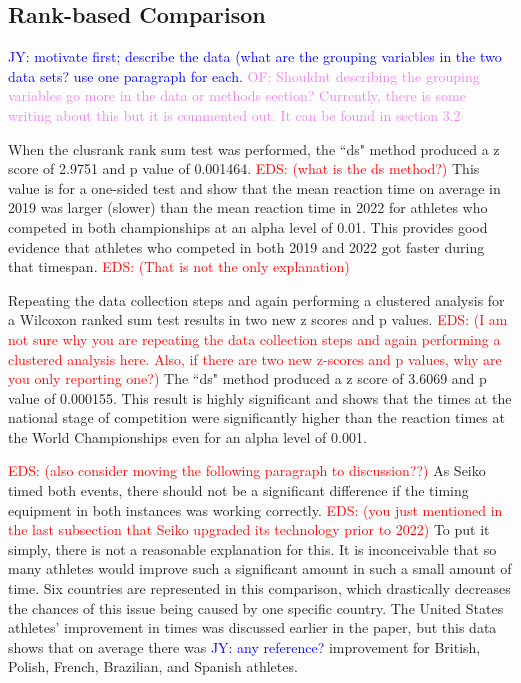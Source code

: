 \documentclass[12pt, letterpaper, titlepage]{article}
\newcommand{\jy}[1]{\textcolor{blue}{JY: #1}}
\newcommand{\eds}[1]{\textcolor{red}{EDS: (#1)}}
\newcommand{\of}[1]{\textcolor{violet}{OF: #1}}
\begin{document}
\subsection{Rank-based Comparison} \label{subsec:Results_Rank}


\jy{motivate first; describe the data (what are the grouping variables in the
  two data sets? use one paragraph for each.}
\of{Shouldnt describing the grouping variables go more in the data or methods 
section?  Currently, there is some writing about this but it is commented out. It
can be found in section 3.2}



When the clusrank rank sum test was performed, the ``ds" method produced a z score of
2.9751 and p value of 0.001464.  \eds{what is the ds method?} 
This value is for a one-sided test and show that
the mean reaction time on average in 2019 was larger (slower) than the mean 
reaction time
in 2022 for athletes who competed in both championships at an alpha level of 0.01.
This provides good evidence that athletes who competed in both 2019 and 2022 got
faster during that timespan.  \eds{That is not the only explanation}


Repeating the data collection steps and
again performing a clustered analysis for a Wilcoxon ranked sum test
results in two new z scores and p values. 
\eds{I am not sure why you are repeating the data collection steps and
again performing a clustered analysis here.  Also, if there are two new z-scores
and p values, why are you only reporting one?}
  The ``ds" method produced a z score of
3.6069 and p value of 0.000155. This result is highly significant and shows that
the times at the national stage of competition were significantly higher than
the reaction times at the World Championships even for an alpha level of 0.001.

\eds{also consider moving the following paragraph to discussion??}
As Seiko timed both events, there should not be a significant
difference if the timing equipment in both instances was working correctly.
\eds{you just mentioned in the last subsection that Seiko upgraded its 
technology prior to 2022}
  To put it simply, there is not a reasonable explanation for 
this. It is inconceivable that so many athletes would improve such a significant
amount in such a small amount of time. Six countries are represented in this 
comparison, which drastically decreases the chances of this issue being caused by
one specific country.  The United States athletes' improvement in times was
discussed earlier in the paper, but this data shows that on average there was
\jy{any reference?}
improvement for British, Polish, French, Brazilian, and Spanish athletes.
\end{document}

